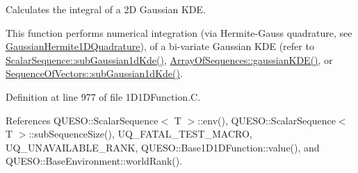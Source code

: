 Calculates the integral of a 2\-D Gaussian K\-D\-E. 

This function performs numerical integration (via Hermite-\/\-Gauss quadrature, see \hyperlink{class_q_u_e_s_o_1_1_gaussian_hermite1_d_quadrature}{Gaussian\-Hermite1\-D\-Quadrature}), of a bi-\/variate Gaussian K\-D\-E (refer to \hyperlink{class_q_u_e_s_o_1_1_scalar_sequence_af16ce4767da1bfe61f40652d3fb6d418}{Scalar\-Sequence\-::sub\-Gaussian1d\-Kde()}, \hyperlink{class_q_u_e_s_o_1_1_array_of_sequences_ade11b2ce02c1b7501a1c465dcfe63a1d}{Array\-Of\-Sequences\-::gaussian\-K\-D\-E()}, or \hyperlink{class_q_u_e_s_o_1_1_sequence_of_vectors_a71c2d67969c2992c3c8a532734ddfcce}{Sequence\-Of\-Vectors\-::sub\-Gaussian1d\-Kde()}. 

Definition at line 977 of file 1\-D1\-D\-Function.\-C.



References Q\-U\-E\-S\-O\-::\-Scalar\-Sequence$<$ T $>$\-::env(), Q\-U\-E\-S\-O\-::\-Scalar\-Sequence$<$ T $>$\-::sub\-Sequence\-Size(), U\-Q\-\_\-\-F\-A\-T\-A\-L\-\_\-\-T\-E\-S\-T\-\_\-\-M\-A\-C\-R\-O, U\-Q\-\_\-\-U\-N\-A\-V\-A\-I\-L\-A\-B\-L\-E\-\_\-\-R\-A\-N\-K, Q\-U\-E\-S\-O\-::\-Base1\-D1\-D\-Function\-::value(), and Q\-U\-E\-S\-O\-::\-Base\-Environment\-::world\-Rank().


